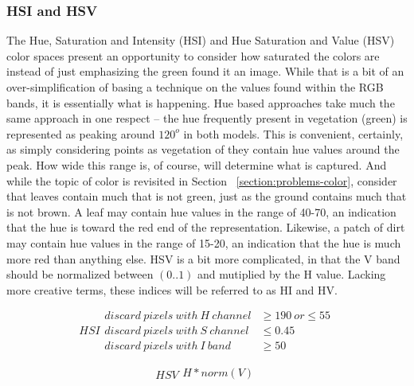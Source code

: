 \documentclass[letterpaper]{article}
\begin{document}
{{\subsubsection{HSI and HSV}
The Hue, Saturation and Intensity (HSI) and Hue Saturation and Value (HSV) color spaces present an opportunity to consider how saturated the colors are instead of just emphasizing the green found it an image. While that is a bit of an over-simplification of basing a technique on the values found within the RGB bands, it is essentially what is happening. Hue based approaches take much the same approach in one respect -- the hue frequently present in vegetation (green) is represented as peaking around $120^o$ in both models. This is convenient, certainly, as simply considering points as vegetation of they contain hue values around the peak. How wide this range is, of course, will determine what is captured. And while the topic of color is revisited in Section ~\ref{section:problems-color}, consider that leaves contain much that is not green, just as the ground contains much that is not brown. A leaf may contain hue values in the range of 40-70, an indication that the hue is toward the red end of the representation. Likewise, a patch of dirt may contain hue values in the range of 15-20, an indication that the hue is much more red than anything else. HSV is a bit more complicated, in that the V band should be normalized between $(0..1)$ and mutiplied by the H value. Lacking more creative terms, these indices will be referred to as HI and HV. 

\begin{equation}
	\label{equation:hsi}
	HSI
    \begin{split}
		discard~pixels~with~H~channel &\geq 190~or \leq 55\\
		discard~pixels~with~S~channel &\leq 0.45 \\
		discard~pixels~with~I~band &\geq 50
    \end{split}
\end{equation}

\begin{equation}
	\label{equation:hsv}
	HSV
	\begin{split}
		H * norm(V) \\
	\end{split}
\end{equation}

}}
\end{document}
